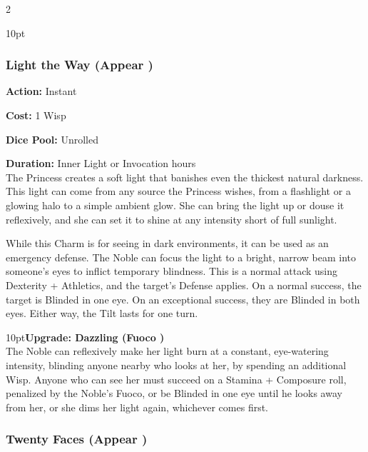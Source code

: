 \begin{multicols}{2}
\begin{myindentpar}{10pt}
\end{myindentpar}


\subsubsection*{Light the Way (Appear \textbullet)}

\noindent \textbf{Action:} Instant 

\noindent \textbf{Cost:} 1 Wisp 

\noindent \textbf{Dice Pool:} Unrolled 

\noindent \textbf{Duration:} Inner Light or Invocation hours \\

\noindent The Princess creates a soft light that banishes even the thickest natural darkness. This light can come from any source the Princess wishes, from a flashlight or a glowing halo to a simple ambient glow. She can bring the light up or douse it reflexively, and she can set it to shine at any intensity short of full sunlight.

While this Charm is for seeing in dark environments, it can be used as an emergency defense. The Noble can focus the light to a bright, narrow beam into someone’s eyes to inflict temporary blindness. This is a normal attack using Dexterity + Athletics, and the target’s Defense applies. On a normal success, the target is Blinded in one eye. On an exceptional success, they are Blinded in both eyes. Either way, the Tilt lasts for one turn.

\begin{myindentpar}{10pt}\textbf{Upgrade: Dazzling (Fuoco \textbullet)}\\

\noindent The Noble can reflexively make her light burn at a constant, eye-watering intensity, blinding anyone nearby who looks at her, by spending an additional Wisp. Anyone who can see her must succeed on a Stamina + Composure roll, penalized by the Noble’s Fuoco, or be Blinded in one eye until he looks away from her, or she dims her light again, whichever comes first.\end{myindentpar}

\subsubsection*{Twenty Faces (Appear \textbullet)}


\end{multicols}
